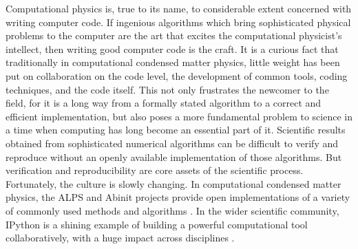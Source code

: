 Computational physics is, true to its name, to considerable extent concerned
with writing computer code. If ingenious algorithms which bring sophisticated
physical problems to the computer are the art that excites the computational
physicist's intellect, then writing good computer code is the craft. It is a
curious fact that traditionally in computational condensed matter physics,
little weight has been put on collaboration on the code level, the development
of common tools, coding techniques, and the code itself. This not only
frustrates the newcomer to the field, for it is a long way from a formally
stated algorithm to a correct and efficient implementation, but also poses a
more fundamental problem to science in a time when computing has long become an
essential part of it. Scientific results obtained from sophisticated numerical
algorithms can be difficult to verify and reproduce without an openly available
implementation of those algorithms. But verification and reproducibility are
core assets of the scientific process. Fortunately, the culture is slowly
changing. In computational condensed matter physics, the ALPS and Abinit
projects provide open implementations of a variety of commonly used methods and
algorithms \cite{bauer2011alps, gonze2009abinit}. In the wider scientific
community, IPython is a shining example of building a powerful computational
tool collaboratively, with a huge impact across disciplines
\cite{perez2007ipython}.

